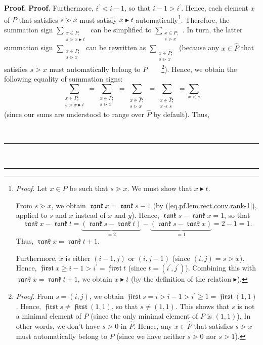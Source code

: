 \documentclass[numbers=enddot,12pt,final,onecolumn,notitlepage]{scrartcl}%
\theoremstyle{definition}
\newenvironment{verlong}{}{}
\DeclareMathOperator{\first}{\mathfrak{first}}
\DeclareMathOperator{\rank}{\mathfrak{rank}}
\newenvironment{proof}[1][Proof]{\noindent\textbf{#1.} }{\ \rule{0.5em}{0.5em}}
\let\sumnonlimits\sum
\renewcommand{\sum}{\sumnonlimits\limits}
\begin{document}
\begin{proof}
\begin{proof}
\begin{verlong}
Furthermore, $i^{\prime}<i-1$, so that $i-1>i^{\prime}$. Hence, each element
$x$ of $P$ that satisfies $s\gtrdot x$ must satisfy $x\blacktriangleright t$
automatically\footnote{\textit{Proof.} Let $x\in P$ be such that $s\gtrdot x$.
We must show that $x\blacktriangleright t$.
\par
From $s\gtrdot x$, we obtain $\rank x=\rank s-1$ (by
(\ref{eq.pf.lem.rect.conv.rank-1}), applied to $s$ and $x$ instead of $x$ and
$y$). Hence, $\rank s-\rank x=1$, so that%
\[
\rank x-\rank t=\underbrace{\left(  \rank s-\rank t\right)  }_{=2}%
-\underbrace{\left(  \rank s-\rank x\right)  }_{=1}=2-1=1.
\]
Thus, $\rank x=\rank t+1$.
\par
Furthermore, $x$ is either $\left(  i-1,j\right)  $ or $\left(  i,j-1\right)
$ (since $\left(  i,j\right)  =s\gtrdot x$). Hence, $\first x\geq
i-1>i^{\prime}=\first t$ (since $t=\left(  i^{\prime},j^{\prime}\right)  $).
Combining this with $\rank x=\rank t+1$, we obtain $x\blacktriangleright t$
(by the definition of the relation $\blacktriangleright$).}. Therefore, the
summation sign $\sum_{\substack{x\in P;\\s\gtrdot x\blacktriangleright t}}$
can be simplified to $\sum_{\substack{x\in P;\\s\gtrdot x}}$. In turn, the
latter summation sign $\sum_{\substack{x\in P;\\s\gtrdot x}}$ can be rewritten
as $\sum_{\substack{x\in\widehat{P};\\s\gtrdot x}}$ (because any
$x\in\widehat{P}$ that satisfies $s\gtrdot x$ must automatically belong to
$P$\ \ \ \ \footnote{\textit{Proof.} From $s=\left(  i,j\right)  $, we obtain
$\first s=i>i-1>i^{\prime}\geq1=\first\left(  1,1\right)  $. Hence, $\first
s\neq\first\left(  1,1\right)  $, so that $s\neq\left(  1,1\right)  $. This
shows that $s$ is not a minimal element of $P$ (since the only minimal element
of $P$ is $\left(  1,1\right)  $). In other words, we don't have $s\gtrdot0$
in $\widehat{P}$. Hence, any $x\in\widehat{P}$ that satisfies $s\gtrdot x$
must automatically belong to $P$ (since we have neither $s\gtrdot0$ nor
$s\gtrdot1$).}). Hence, we obtain the following equality of summation signs:%
\[
\sum_{\substack{x\in P;\\s\gtrdot x\blacktriangleright t}}=\sum
_{\substack{x\in P;\\s\gtrdot x}}=\sum_{\substack{x\in\widehat{P};\\s\gtrdot
x}}=\sum_{\substack{x\in\widehat{P};\\x\lessdot s}}=\sum_{x\lessdot s}%
\]
(since our sums are understood to range over $\widehat{P}$ by default). Thus,%

\end{verlong}
\end{proof}
\end{proof}
\end{document}
